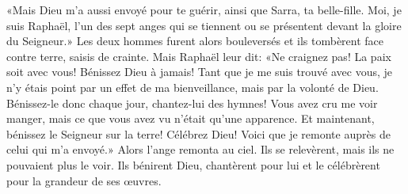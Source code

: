 «Mais Dieu m’a aussi envoyé pour te guérir, ainsi que Sarra, ta belle-fille.
Moi, je suis Raphaël,
	l’un des sept anges qui se tiennent ou se présentent
		devant la gloire du Seigneur.»
Les deux hommes furent alors bouleversés
	et ils tombèrent face contre terre, saisis de crainte.
Mais Raphaël leur dit: «Ne craignez pas!
	La paix soit avec vous! Bénissez Dieu à jamais!
Tant que je me suis trouvé avec vous,
	je n’y étais point par un effet de ma bienveillance,
	mais par la volonté de Dieu.
Bénissez-le donc chaque jour, chantez-lui des hymnes!
Vous avez cru me voir manger,
	mais ce que vous avez vu n’était qu’une apparence.
Et maintenant, bénissez le Seigneur sur la terre! Célébrez Dieu!
	Voici que je remonte auprès de celui qui m’a envoyé.»
Alors l’ange remonta au ciel.
Ils se relevèrent, mais ils ne pouvaient plus le voir.
Ils bénirent Dieu, chantèrent pour lui
	et le célébrèrent pour la grandeur de ses œuvres.
